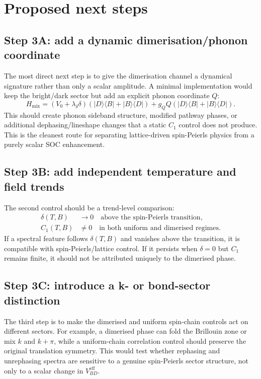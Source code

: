 \documentclass[11pt]{article}
\begin{document}
\section{Proposed next steps}
\subsection{Step 3A: add a dynamic dimerisation/phonon coordinate}
The most direct next step is to give the dimerisation channel a dynamical
signature rather than only a scalar amplitude.  A minimal implementation would
keep the bright/dark sector but add an explicit phonon coordinate $Q$:
\begin{equation}
H_{\mathrm{mix}} =
\left(V_0 + \lambda_\delta \delta\right)
\left(|D\rangle\langle B| + |B\rangle\langle D|\right)
+ g_Q Q
\left(|D\rangle\langle B| + |B\rangle\langle D|\right).
\end{equation}
This should create phonon sideband structure, modified pathway phases, or
additional dephasing/lineshape changes that a static $C_1$ control does not
produce.  This is the cleanest route for separating lattice-driven
spin-Peierls physics from a purely scalar SOC enhancement.

\subsection{Step 3B: add independent temperature and field trends}
The second control should be a trend-level comparison:
\begin{align}
\delta(T,B) &\rightarrow 0 \quad \text{above the spin-Peierls transition},\\
C_1(T,B) &\neq 0 \quad \text{in both uniform and dimerised regimes}.
\end{align}
If a spectral feature follows $\delta(T,B)$ and vanishes above the transition,
it is compatible with spin-Peierls/lattice control.  If it persists when
$\delta=0$ but $C_1$ remains finite, it should not be attributed uniquely to
the dimerised phase.

\subsection{Step 3C: introduce a k- or bond-sector distinction}
The third step is to make the dimerised and uniform spin-chain controls act on
different sectors.  For example, a dimerised phase can fold the Brillouin zone
or mix $k$ and $k+\pi$, while a uniform-chain correlation control should preserve
the original translation symmetry.  This would test whether rephasing and
unrephasing spectra are sensitive to a genuine spin-Peierls sector structure,
not only to a scalar change in $V_{BD}^{\mathrm{eff}}$.
\end{document}
